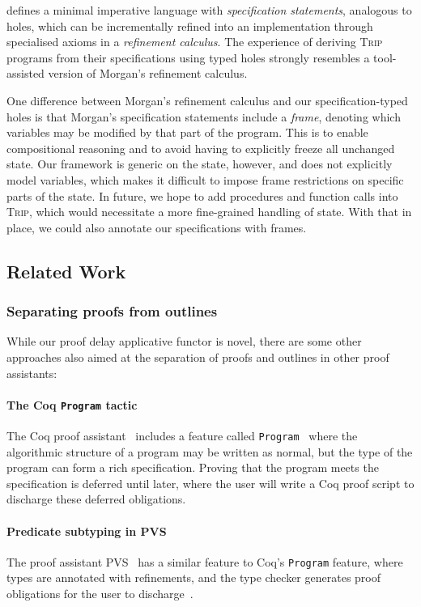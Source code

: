 \documentclass[sigplan]{acmart}%
\begin{document}
\citet{Morgan} defines a minimal imperative language with \emph{specification
statements}, analogous to holes, which can be incrementally refined into
an implementation through specialised axioms in a \emph{refinement calculus}. 
The experience of deriving \textsc{Trip} programs from their specifications 
using typed holes strongly resembles a tool-assisted version of Morgan's 
refinement calculus.

One difference between Morgan's refinement calculus and our specification-typed holes
is that Morgan's specification statements include a \emph{frame}, denoting 
which variables may be modified by that part of the program. This is to enable 
compositional reasoning and to avoid having to explicitly freeze all unchanged state.
Our framework is generic on the state, however, and does not explicitly model 
variables, which makes it difficult to impose frame restrictions on 
specific parts of the state. In future, we hope to add procedures 
and function calls into \textsc{Trip}, which would necessitate 
a more fine-grained handling of state. With that in place, we could 
also annotate our specifications with frames.

\subsection{Related Work}
\subsubsection{Separating proofs from outlines}
While our proof delay applicative functor is novel, there are some other approaches 
also aimed at the separation of proofs and outlines in other proof assistants:

\paragraph{The Coq \texttt{Program} tactic} The Coq proof assistant~\citep{coq}
includes a feature called \texttt{Program}~\citep{coqprogram} where the algorithmic structure 
of a program may be written as normal, but the type of the program can form 
a rich specification. Proving that the program meets the specification is 
deferred until later, where the user will write a Coq proof script to discharge 
these deferred obligations. 

\paragraph{Predicate subtyping in PVS} The proof assistant PVS~\citep{pvs} has 
a similar feature to Coq's \texttt{Program} feature, where types are annotated 
with refinements, and the type checker generates proof obligations for the user 
to discharge~\citep{pvsprogram}.\medskip
\end{document}
